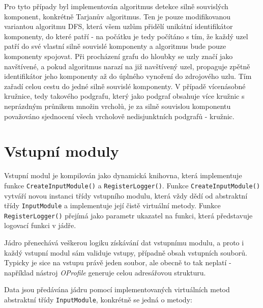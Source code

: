 \documentclass[czech,BP]{thesiskiv}
\begin{document}
Pro tyto případy byl implementován algoritmus detekce silně souvislých komponent, konkrétně Tarjanův algoritmus. Ten je pouze modifikovanou variantou algoritmu DFS, která všem uzlům přidělí unikátní identifikátor komponenty, do které patří - na počátku je tedy počítáno s tím, že každý uzel patří do své vlastní silně souvislé komponenty a algoritmus bude pouze komponenty spojovat. Při procházení grafu do hloubky se uzly značí jako navštívené, a pokud algoritmus narazí na již navštívený uzel, propaguje zpětně identifikátor jeho komponenty až do úplného vynoření do zdrojového uzlu. Tím zařadí celou cestu do jedné silně souvislé komponenty. V případě vícenásobné kružnice, tedy takového podgrafu, který jako podgraf obsahuje více kružnic s neprázdným průnikem množin vrcholů, je za silně souvislou komponentu považováno sjednocení všech vrcholově nedisjunktních podgrafů - kružnic.

\section{Vstupní moduly}

Vstupní modul je kompilován jako dynamická knihovna, která implementuje funkce \texttt{CreateInputModule()} a \texttt{RegisterLogger()}. Funkce \texttt{CreateInputModule()} vytváří novou instanci třídy vstupního modulu, která vždy dědí od abstraktní třídy \texttt{InputModule} a implementuje její čistě virtuální metody. Funkce \texttt{RegisterLogger()} přejímá jako parametr ukazatel na funkci, která představuje logovací funkci v jádře.

Jádro přenechává veškerou logiku získávání dat vstupnímu modulu, a proto i každý vstupní modul sám validuje vstupy, případně obsah vstupních souborů. Typicky je sice na vstupu právě jeden soubor, ale obecně to tak neplatí - například nástroj \emph{OProfile} generuje celou adresářovou strukturu.

Data jsou předávána jádru pomocí implementovaných virtuálních metod abstraktní třídy \texttt{InputModule}, konkrétně se jedná o metody:
\end{document}
